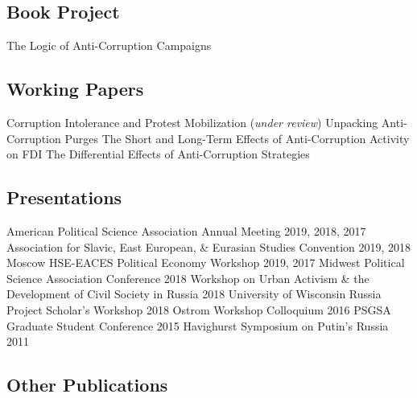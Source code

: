 \documentclass[11pt,]{article}
\begin{document}
\hypertarget{book-project}{%
\subsection{Book Project}\label{book-project}}

The Logic of Anti-Corruption Campaigns

\hypertarget{working-papers}{%
\subsection{Working Papers}\label{working-papers}}

Corruption Intolerance and Protest Mobilization (\emph{under review})
\hfill \newline Unpacking Anti-Corruption Purges \hfill \newline The
Short and Long-Term Effects of Anti-Corruption Activity on FDI
\hfill \newline The Differential Effects of Anti-Corruption Strategies

\hypertarget{presentations}{%
\subsection{Presentations}\label{presentations}}

American Political Science Association Annual Meeting \hfill 2019, 2018,
2017 \newline Association for Slavic, East European, \& Eurasian Studies
Convention \hfill 2019, 2018 \newline Moscow HSE-EACES Political Economy
Workshop \hfill 2019, 2017 \newline Midwest Political Science
Association Conference \hfill 2018 \newline Workshop on Urban Activism
\& the Development of Civil Society in Russia \hfill 2018 \newline
University of Wisconsin Russia Project Scholar's Workshop \hfill 2018
\newline Ostrom Workshop Colloquium \hfill 2016 \newline PSGSA Graduate
Student Conference \hfill 2015 \newline Havighurst Symposium on Putin's
Russia \hfill 2011

\hypertarget{other-publications}{%
\subsection{Other Publications}\label{other-publications}}
\end{document}
